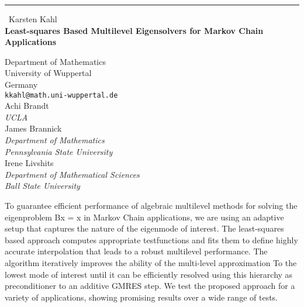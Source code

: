 \documentclass{report}
\begin{document}
\begin{center}
\rule{6in}{1pt} \
{\large Karsten Kahl \\
{\bf  Least-squares Based Multilevel Eigensolvers for Markov Chain Applications}}

Department of Mathematics \\
University of Wuppertal \\
Germany \\
{\tt kkahl@math.uni-wuppertal.de} \\
Achi Brandt \\
{\em UCLA} \\
James Brannick \\
{\em Department of Mathematics \\ Pennsylvania State University} \\
Irene Livshits \\
{\em Department of Mathematical Sciences \\ Ball State University} \\ %
\end{center}

To guarantee efficient performance of algebraic multilevel
methods for solving the eigenproblem Bx = x in Markov
Chain applications, we are using an adaptive setup that
captures the nature of the eigenmode of interest. The
least-squares based approach computes appropriate testfunctions
and fits them to define highly accurate interpolation
that leads to a robust multilevel performance.
The algorithm iteratively improves the ability of the multi-level
approximation To the lowest mode of interest until it can be efficiently
resolved using this hierarchy as preconditioner to an additive GMRES step.
We test the proposed approach for a variety of applications, showing promising
results over a wide range of tests.
\end{document}
